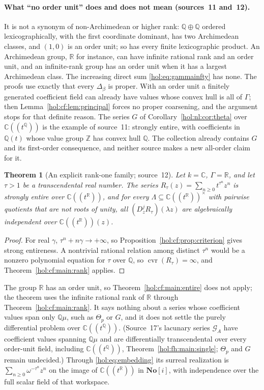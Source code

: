 \documentclass[11pt]{article}
\numberwithin{equation}{section}
\newtheorem{theorem}{Theorem}[section]
\theoremstyle{definition}
\theoremstyle{remark}
\newcommand{\C}{\mathbb C}
\newcommand{\R}{\mathbb R}
\newcommand{\Q}{\mathbb Q}
\newcommand{\Z}{\mathbb Z}
\newcommand{\No}{\mathbf{No}}
\newcommand{\cvr}{\operatorname{cvr}}
\begin{document}
\paragraph{What ``no order unit'' does and does not mean (sources~11 and~12).}
It is not a synonym of non-Archimedean or higher rank: $\Q\oplus\Q$ ordered
lexicographically, with the first coordinate dominant, has two Archimedean
classes, and $(1,0)$ is an order unit; so has every finite lexicographic
product. An Archimedean group, $\R$ for instance, can have infinite rational
rank and an order unit, and an infinite-rank group has an order unit when it
has a largest Archimedean class. The increasing direct sum
\eqref{hol:eq:gammainfty} has none. The proofs use exactly that every
$\Delta_\beta$ is proper. With an order unit a finitely generated coefficient
field can already have values whose convex hull is all of $\Gamma$; then
Lemma~\ref{hol:cf:lem:principal} forces no proper coarsening, and the argument
stops for that definite reason. The series $G$ of
Corollary~\ref{hol:nl:cor:theta} over $\C((t^\Q))$ is the example of
source~11: strongly entire, with coefficients in $\Q(t)$ whose value group
$\Z$ has convex hull $\Q$. The collection already contains $G$ and its
first-order consequence, and neither source makes a new all-order claim for
it.

\begin{theorem}[An explicit rank-one family; source~12]
\label{hol:cf:thm:rankone}
Let $k=\C$, $\Gamma=\R$, and let $\tau>1$ be a transcendental real number. The
series $R_\tau(z)=\sum_{n\ge0}t^{\tau^n}z^n$ is strongly entire over
$\C((t^\R))$, and for every $\Lambda\subseteq\C((t^\R))^\times$ with pairwise
quotients that are not roots of unity, all $(D_z^jR_\tau)(\lambda z)$ are
algebraically independent over $\C((t^\R))(z)$.
\end{theorem}

\begin{proof}
For real $\gamma$, $\tau^n+n\gamma\to+\infty$, so
Proposition~\ref{hol:cf:prop:criterion} gives strong entireness. A nontrivial
rational relation among distinct $\tau^n$ would be a nonzero polynomial
equation for $\tau$ over $\Q$, so $\cvr(R_\tau)=\infty$, and
Theorem~\ref{hol:cf:main:rank} applies.
\end{proof}

The group $\R$ has an order unit, so Theorem~\ref{hol:cf:main:entire} does not
apply; the theorem uses the infinite rational rank of $\R$ through
Theorem~\ref{hol:cf:main:rank}. It says nothing about a series whose
coefficient values span only $\Q\mu$, such as $\Theta_p$ or $G$, and it does
not settle the purely differential problem over $\C((t^\Q))$. (Source~17's
lacunary series $\mathcal G_A$ have coefficient values spanning $\Q\mu$ and are
differentially transcendental over every order-unit field, including
$\C((t^\Q))$, Theorem~\ref{hol:fh:main:single}; $\Theta_p$ and $G$ remain
undecided.) Through
\eqref{hol:eq:embedding} its surreal realization is
$\sum_{n\ge0}\omega^{-\tau^n}z^n$ on the image of $\C((t^\R))$ in $\No[i]$,
with independence over the full scalar field of that workspace.
\end{document}
